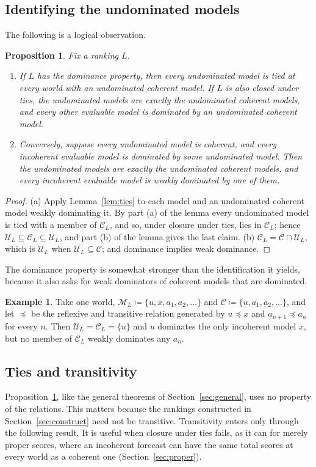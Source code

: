 \documentclass[11pt]{article}
\newtheorem{proposition}[theorem]{Proposition}
\theoremstyle{definition}
\newtheorem{example}[theorem]{Example}
\theoremstyle{remark}
\newcommand{\M}{\mathcal M}
\newcommand{\C}{\mathcal C}
\newcommand{\U}{\mathcal U}
\begin{document}
\subsection{Identifying the undominated models}
The following is a logical observation.
\begin{proposition}\label{prop:conclusion}
Fix a ranking $L$.
\begin{enumerate}[label=(\alph*)]
\item If $L$ has the dominance property, then every undominated model is tied at every world with an undominated coherent model. If $L$ is also closed under ties, the undominated models are exactly the undominated coherent models, and every other evaluable model is dominated by an undominated coherent model.
\item Conversely, suppose every undominated model is coherent, and every incoherent evaluable model is dominated by some undominated model. Then the undominated models are exactly the undominated coherent models, and every incoherent evaluable model is weakly dominated by one of them.
\end{enumerate}
\end{proposition}
\begin{proof}
(a) Apply Lemma~\ref{lem:ties} to each model and an undominated coherent model weakly dominating it. By part (a) of the lemma every undominated model is tied with a member of $\C_L$, and so, under closure under ties, lies in $\C_L$; hence $\U_L\subseteq\C_L\subseteq\U_L$, and part (b) of the lemma gives the last claim.
(b) $\C_L=\C\cap\U_L$, which is $\U_L$ when $\U_L\subseteq\C$; and dominance implies weak dominance.
\end{proof}

The dominance property is somewhat stronger than the identification it yields, because it also asks for weak dominators of coherent models that are dominated.
\begin{example}\label{ex:conclusion-stronger}
Take one world, $\M_L\coloneqq\{u,x,a_1,a_2,\dots\}$ and $\C\coloneqq\{u,a_1,a_2,\dots\}$, and let $\preceq$ be the reflexive and transitive relation generated by $u\preceq x$ and $a_{n+1}\preceq a_n$ for every $n$. Then $\U_L=\C_L=\{u\}$ and $u$ dominates the only incoherent model $x$, but no member of $\C_L$ weakly dominates any $a_n$.
\end{example}

\subsection{Ties and transitivity}
Proposition~\ref{prop:conclusion}, like the general theorems of Section~\ref{sec:general}, uses no property of the relations. This matters because the rankings constructed in Section~\ref{sec:construct} need not be transitive. Transitivity enters only through the following result. It is useful when closure under ties fails, as it can for merely proper scores, where an incoherent forecast can have the same total scores at every world as a coherent one (Section~\ref{sec:proper}).
\end{document}
